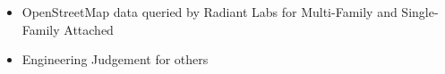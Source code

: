 \begin{itemize}
\item OpenStreetMap data queried by Radiant Labs for Multi-Family and Single-Family Attached
\item Engineering Judgement for others
\end{itemize}

